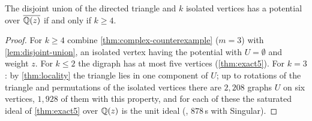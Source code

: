 \begin{proposition}\label{prop:c3-minimal}
The disjoint union of the directed triangle and $k$ isolated vertices has a potential over $\overline{\mathbb{Q}(z)}$ if and only if $k\ge4$.
\end{proposition}
\begin{proof}
For $k\ge4$ combine \cref{thm:complex-counterexample} ($m=3$) with \cref{lem:disjoint-union}, an isolated vertex having the potential with $U=\emptyset$ and weight $z$. For $k\le2$ the digraph has at most five vertices (\cref{thm:exact5}). For $k=3$: by \cref{thm:locality} the triangle lies in one component of $U$; up to rotations of the triangle and permutations of the isolated vertices there are $2{,}208$ graphs $U$ on six vertices, $1{,}928$ of them with this property, and for each of these the saturated ideal of \cref{thm:exact5} over $\mathbb{Q}(z)$ is the unit ideal (, $878$\,s with Singular).
\end{proof}

